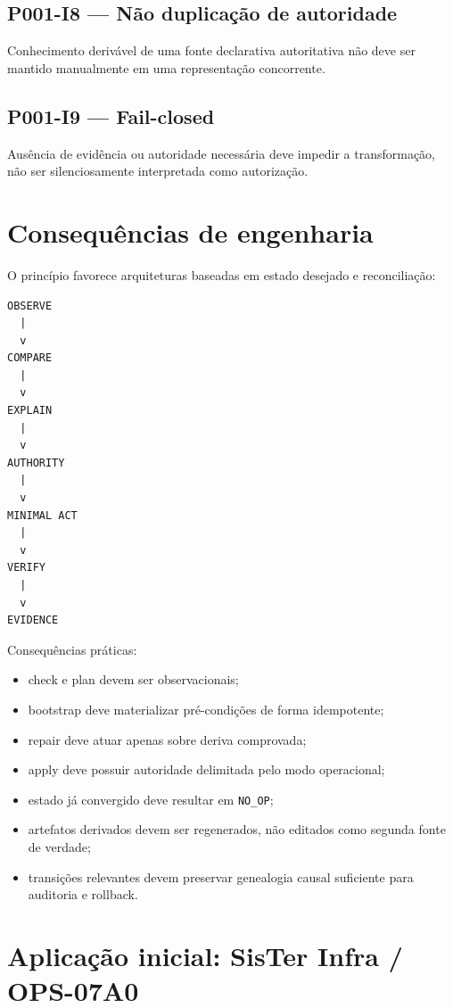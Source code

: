 \subsection*{P001-I8 --- Não duplicação de autoridade}
Conhecimento derivável de uma fonte declarativa autoritativa não deve ser
mantido manualmente em uma representação concorrente.

\subsection*{P001-I9 --- Fail-closed}
Ausência de evidência ou autoridade necessária deve impedir a transformação,
não ser silenciosamente interpretada como autorização.

\section{Consequências de engenharia}

O princípio favorece arquiteturas baseadas em estado desejado e reconciliação:

\begin{verbatim}
OBSERVE
  |
  v
COMPARE
  |
  v
EXPLAIN
  |
  v
AUTHORITY
  |
  v
MINIMAL ACT
  |
  v
VERIFY
  |
  v
EVIDENCE
\end{verbatim}

Consequências práticas:

\begin{itemize}
  \item check e plan devem ser observacionais;
  \item bootstrap deve materializar pré-condições de forma idempotente;
  \item repair deve atuar apenas sobre deriva comprovada;
  \item apply deve possuir autoridade delimitada pelo modo operacional;
  \item estado já convergido deve resultar em \texttt{NO\_OP};
  \item artefatos derivados devem ser regenerados, não editados como segunda
  fonte de verdade;
  \item transições relevantes devem preservar genealogia causal suficiente para
  auditoria e rollback.
\end{itemize}

\section{Aplicação inicial: SisTer Infra / OPS-07A0}

